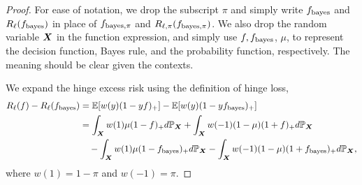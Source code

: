 \documentclass[11pt]{article}
\theoremstyle{plain}
\theoremstyle{definition}
\def\bayesf{f_{\textup{bayes}}}
\def\bayespif{f_{\textup{bayes},\pi}}
\begin{document}
\begin{proof} For ease of notation, we drop the subscript $\pi$ and simply write $\bayesf$ and $R_\ell(\bayesf)$ in place of $\bayespif$ and $R_{\ell,\pi}(\bayespif)$. We also drop the random variable $\bm X$ in the function expression, and simply use $f, \bayesf$, $\mu$, to represent the decision function, Bayes rule, and the probability function, respectively. The meaning should be clear given the contexts. 

We expand the hinge excess risk using the definition of hinge loss,
\begin{align}\label{eq:function}
R_{\ell}(f)-R_{\ell}(\bayesf)&= \mathbb{E}[w(y)(1-yf)_{+}]-\mathbb{E}[w(y)(1-y\bayesf)_{+}] \notag\\
&= \int_{\mX}w(1)\mu(1-f)_{+}d\mathbb{P}_{\mX}+\int_{\mX}w(-1)(1-\mu)(1+f)_{+}d\mathbb{P}_{\mX}\notag \\
&\quad -\int_{\mX}w(1)\mu(1-\bayesf)_{+}d\mathbb{P}_{\mX}-\int_{\mX}w(-1)(1-\mu)(1+\bayesf)_{+}d\mathbb{P}_{\mX},
\end{align}
where $w(1)=1-\pi$ and $w(-1)=\pi$. 


\end{proof}
\end{document}
